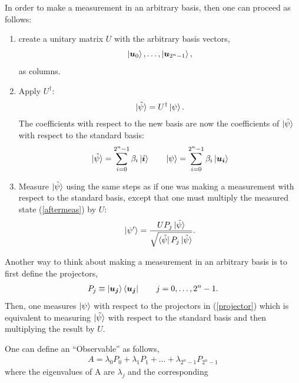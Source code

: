 \documentclass[a4paper,fleqn]{cas-sc}
\newcommand{\bmu}{\mbox{\boldmath $u$\unboldmath}}
\newcommand{\bmi}{\mbox{\boldmath $i$\unboldmath}}
\newcommand{\bmui}{\mbox{\boldmath $u_{i}$\unboldmath}}
\newcommand{\bmuj}{\mbox{\boldmath $u_{j}$\unboldmath}}
\begin{document}
In order to make a measurement in an arbitrary basis\cite{AWSmeasure}, then
one can proceed as follows:
\begin{enumerate}
\item create a unitary matrix $U$ with the arbitrary basis vectors,
  \begin{eqnarray*}
  \ket{\bmu_{0}},\ldots,\ket{\bmu_{2^{n}-1}},
  \end{eqnarray*}
  as columns.
\item Apply $U^{\dag}$:
  \begin{eqnarray*}
  \ket{\tilde{\psi}}=U^{\dag}\ket{\psi}.
  \end{eqnarray*}
  The coefficients with respect to the new basis are now the
  coefficients of $\ket{\tilde{\psi}}$ with respect to the standard basis:
  \begin{eqnarray*}
  \ket{\tilde\psi}=\sum_{i=0}^{2^{n}-1} \beta_{i}\ket{\bmi} \hspace{20pt}
     \ket{\psi}=\sum_{i=0}^{2^{n}-1} \beta_{i}\ket{\bmui}
  \end{eqnarray*}
\item Measure $\ket{\tilde\psi}$ using the same steps as if one was
   making a measurement with respect to the standard basis, except that
   one must multiply the measured state (\ref{aftermeas}) by $U$:
   \begin{eqnarray}
   \ket{\psi'}=\frac{U P_{j}\ket{\tilde{\psi}}}{\sqrt{\bra{\tilde{\psi}}P_{j}\ket{\tilde{\psi}}}}.
   \end{eqnarray}

\end{enumerate}
\par\noindent
Another way to think about making a measurement in an arbitrary 
basis is to first define the projectors,
\begin{eqnarray}
P_{j}\equiv \ket{\bmuj}\bra{\bmuj} \hspace{20pt} j=0,\ldots, 2^{n}-1.
 \label{projector}
\end{eqnarray}
Then, one measures $\ket{\psi}$ with respect to the projectors in
(\ref{projector}) which is equivalent to measuring $\ket{\tilde{\psi}}$
with respect to the standard basis and then multiplying the result by
$U$.  
\par\noindent
One can define an ``Observable'' as follows,
\begin{eqnarray}
A=\lambda_{0}P_{0}+\lambda_{1}P_{1}+\ldots+\lambda_{2^{n}-1}P_{2^{n}-1}
\end{eqnarray}
where the eigenvalues of A are $\lambda_{j}$ and the corresponding
\end{document}
